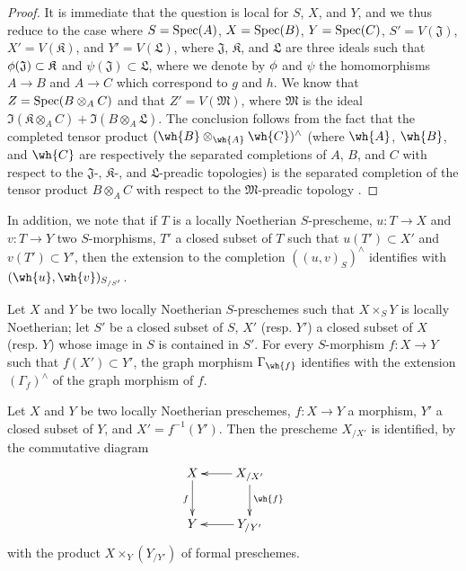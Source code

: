 \begin{proof}
\label{proof-1.10.9.7}
It is immediate that the question is local for $S$, $X$, and $Y$, and we thus reduce to the case where $S=\operatorname{Spec}(A)$, $X=\operatorname{Spec}(B)$, $Y=\operatorname{Spec}(C)$, $S'=V(\mathfrak{J})$, $X'=V(\mathfrak{K})$, and $Y'=V(\mathfrak{L})$, where $\mathfrak{J}$, $\mathfrak{K}$, and $\mathfrak{L}$ are three ideals such that $\phi(\mathfrak{J})\subset\mathfrak{K}$ and $\psi(\mathfrak{J})\subset\mathfrak{L}$, where we denote by $\phi$ and $\psi$ the homomorphisms $A\to B$ and $A\to C$ which correspond to $g$ and $h$.
We know that $Z=\operatorname{Spec}(B\otimes_A C)$ and that $Z'=V(\mathfrak{M})$, where $\mathfrak{M}$ is the ideal $\Im(\mathfrak{K}\otimes_A C)+\Im(B\otimes_A\mathfrak{L})$.
The conclusion follows  from the fact that the completed tensor product $(\wh{B}\otimes_\wh{A}\wh{C})^\wedge$ (where $\wh{A}$, $\wh{B}$, and $\wh{C}$ are respectively the separated completions of $A$, $B$, and $C$ with respect to the $\mathfrak{J}$-, $\mathfrak{K}$-, and $\mathfrak{L}$-preadic topologies) is the separated completion of the tensor product $B\otimes_A C$ with respect to the $\mathfrak{M}$-preadic topology .
\end{proof}

In addition, we note that if $T$ is a locally Noetherian $S$-prescheme, $u:T\to X$ and $v:T\to Y$ two $S$-morphisms, $T'$ a closed subset of $T$ such that $u(T')\subset X'$ and $v(T')\subset Y'$, then the extension to the completion $((u,v)_S)^\wedge$ identifies with $(\wh{u},\wh{v})_{S_{/S'}}$.

\begin{cor}[10.9.8]
\label{1.10.9.8}
Let $X$ and $Y$ be two locally Noetherian $S$-preschemes such that $X\times_S Y$ is locally Noetherian; let $S'$ be a closed subset of $S$, $X'$ (resp. $Y'$) a closed subset of $X$ (resp. $Y$) whose image in $S$ is contained in $S'$.
For every $S$-morphism $f:X\to Y$ such that $f(X')\subset Y'$, the graph morphism $\Gamma_\wh{f}$ identifies with the extension $(\Gamma_f)^\wedge$ of the graph morphism of $f$.
\end{cor}

\begin{cor}[10.9.9]
\label{1.10.9.9}
Let $X$ and $Y$ be two locally Noetherian preschemes, $f:X\to Y$ a morphism, $Y'$ a closed subset of $Y$, and $X'=f^{-1}(Y')$.
Then the prescheme $X_{/X'}$ is identified, by the commutative diagram
\[
  \xymatrix{
    X\ar[d]_f &
    X_{/X'}\ar[l]\ar[d]^{\wh{f}}\\
    Y &
    Y_{/Y'}\ar[l]
  }
\]
with the product $X\times_Y(Y_{/Y'})$ of formal preschemes.
\end{cor}

